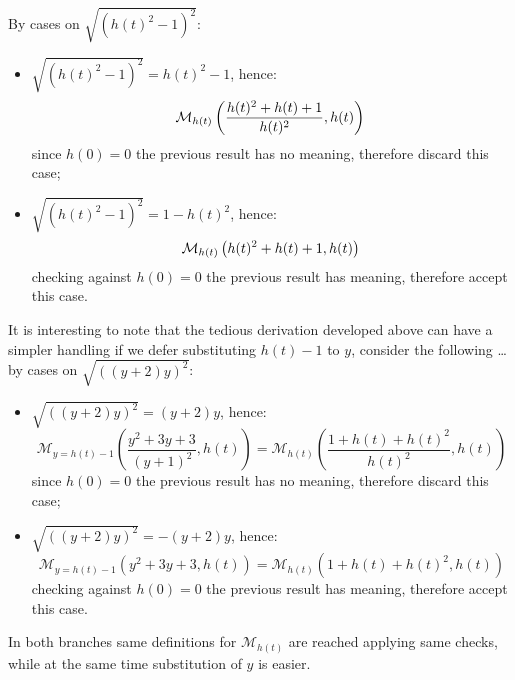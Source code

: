 By cases on $\sqrt{\left(h(t)^2 - 1\right)^{2}}$:
\begin{itemize}
    \item $\sqrt{\left(h(t)^2 - 1\right)^{2}}= h(t)^2 - 1$, hence:
        \begin{displaymath} 
            \mathcal{M}_{h(t)}\left(\frac{ h(t)^{2} + h(t) + 1}{h(t)^{2}} , h(t) \right)\\
        \end{displaymath} 
        since $h(0)=0$ the previous result has no meaning, therefore discard this case;
    \item $\sqrt{\left(h(t)^2 - 1\right)^{2}}= 1-h(t)^2$, hence:
        \begin{displaymath} 
            \mathcal{M}_{h(t)}\left( h(t)^{2} + h(t) + 1, h(t) \right)\\
        \end{displaymath} 
        checking against $h(0)=0$ the previous result has meaning, therefore accept this case.
\end{itemize}

It is interesting to note that the tedious derivation developed above can have
a simpler handling if we defer substituting $h(t)-1$ to $y$, consider the following \ldots
by cases on $\sqrt{\left(\left(y + 2\right) y\right)^{2}}$:
\begin{itemize}
    \item $\sqrt{\left(\left(y + 2\right) y\right)^{2}}=\left(y + 2\right) y$, hence:
        \begin{displaymath} 
            \mathcal{M}_{y=h(t)-1}\left(\frac{y^{2} + 3y + 3}{{\left(y + 1\right)}^{2}} , h(t) \right) = 
                \mathcal{M}_{h(t)}\left( \frac{1+h(t)+h(t)^2}{h(t)^2}, h(t) \right) 
        \end{displaymath} 
        since $h(0)=0$ the previous result has no meaning, therefore discard this case;
    \item $\sqrt{\left(\left(y + 2\right) y\right)^{2}}=-\left(y + 2\right) y$, hence:
        \begin{displaymath} 
            \mathcal{M}_{y=h(t)-1}\left(y^{2} + 3y + 3 , h(t) \right) = 
                \mathcal{M}_{h(t)}\left( 1+h(t)+h(t)^2, h(t) \right) 
        \end{displaymath} 
        checking against $h(0)=0$ the previous result has meaning, therefore accept this case.
\end{itemize}

In both branches same definitions for $\mathcal{M}_{h(t)}$ are reached applying
same checks, while at the same time substitution of $y$ is easier. 

